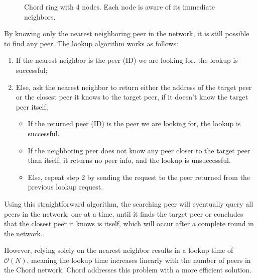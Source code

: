 \begin{figure}[htbp]
    \centering
{}
\caption{Chord ring with 4 nodes. Each node is aware of its immediate neighbors.}
\label{fig:chord-ring-peer-neighbours}
\end{figure}

By knowing only the nearest neighboring peer in the network, it is still possible to find any peer.
The lookup algorithm works as follows:
\begin{enumerate}
    \item If the nearest neighbor is the peer (ID) we are looking for, the lookup is successful;
	\item Else, ask the nearest neighbor to return either the address of the target peer or the closest peer it knows to the target peer, if it doesn't know the target peer itself;
	\begin{itemize}
        \item If the returned peer (ID) is the peer we are looking for, the lookup is successful.
        \item If the neighboring peer does not know any peer closer to the target peer than itself, it returns no peer info, and the lookup is unsuccessful.
        \item Else, repeat step 2 by sending the request to the peer returned from the previous lookup request.
    \end{itemize}
\end{enumerate}

Using this straightforward algorithm, the searching peer will eventually query all peers in the network, one at a time, until it finds the target peer or concludes that the closest peer it knows is itself, which will occur after a complete round in the network.

However, relying solely on the nearest neighbor results in a lookup time of $\mathcal{O}(N)$, meaning the lookup time increases linearly with the number of peers in the Chord network.
Chord addresses this problem with a more efficient solution.

